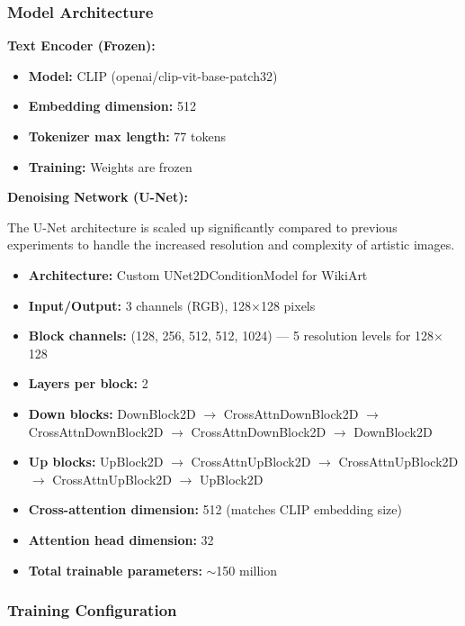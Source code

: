 \subsubsection{Model Architecture}

\textbf{Text Encoder (Frozen):}
\begin{itemize}
    \item \textbf{Model:} CLIP (openai/clip-vit-base-patch32)
    \item \textbf{Embedding dimension:} 512
    \item \textbf{Tokenizer max length:} 77 tokens
    \item \textbf{Training:} Weights are frozen
\end{itemize}

\textbf{Denoising Network (U-Net):}

The U-Net architecture is scaled up significantly compared to previous experiments to handle the increased resolution and complexity of artistic images.

\begin{itemize}
    \item \textbf{Architecture:} Custom UNet2DConditionModel for WikiArt
    \item \textbf{Input/Output:} 3 channels (RGB), 128$\times$128 pixels
    \item \textbf{Block channels:} (128, 256, 512, 512, 1024) --- 5 resolution levels for 128$\times$128
    \item \textbf{Layers per block:} 2
    \item \textbf{Down blocks:} DownBlock2D $\rightarrow$ CrossAttnDownBlock2D $\rightarrow$ CrossAttnDownBlock2D $\rightarrow$ CrossAttnDownBlock2D $\rightarrow$ DownBlock2D
    \item \textbf{Up blocks:} UpBlock2D $\rightarrow$ CrossAttnUpBlock2D $\rightarrow$ CrossAttnUpBlock2D $\rightarrow$ CrossAttnUpBlock2D $\rightarrow$ UpBlock2D
    \item \textbf{Cross-attention dimension:} 512 (matches CLIP embedding size)
    \item \textbf{Attention head dimension:} 32
    \item \textbf{Total trainable parameters:} $\sim$150 million
\end{itemize}

\subsubsection{Training Configuration}

